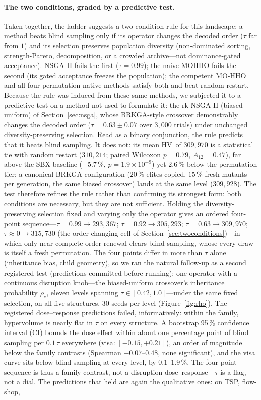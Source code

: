 \documentclass[runningheads]{llncs}
\newcommand{\HV}{\textsf{HV}}
\begin{document}
\paragraph{The two conditions, graded by a predictive test.}
Taken together, the ladder suggests a two-condition rule for this landscape: a method beats blind sampling only if its operator changes the decoded order ($\tau$ far from $1$) and its selection preserves population diversity (non-dominated sorting, strength-Pareto, decomposition, or a crowded archive---not dominance-gated acceptance). NSGA-II fails the first ($\tau=0.99$); the naive MOHHO fails the second (its gated acceptance freezes the population); the competent MO-HHO and all four permutation-native methods satisfy both and beat random restart. Because the rule was induced from these same methods, we subjected it to a predictive test on a method not used to formulate it: the rk-NSGA-II (biased uniform) of Section~\ref{sec:nsga}, whose BRKGA-style crossover demonstrably changes the decoded order ($\tau=0.63\pm0.07$ over $3{,}000$ trials) under unchanged diversity-preserving selection. Read as a binary conjunction, the rule predicts that it beats blind sampling. It does not: its mean \HV\ of $309{,}970$ is a statistical tie with random restart ($310{,}214$; paired Wilcoxon $p=0.79$, $A_{12}=0.47$), far above the SBX baseline ($+5.7\,\%$, $p=1.9\times10^{-9}$) yet $2.6\,\%$ below the permutation tier; a canonical BRKGA configuration ($20\,\%$ elites copied, $15\,\%$ fresh mutants per generation, the same biased crossover) lands at the same level ($309{,}928$). The test therefore refines the rule rather than confirming its strongest form: both conditions are necessary, but they are not sufficient. Holding the diversity-preserving selection fixed and varying only the operator gives an ordered four-point sequence---$\tau{=}0.99\!\to\!293{,}367$; $\tau{=}0.92\!\to\!305{,}293$; $\tau{=}0.63\!\to\!309{,}970$; $\tau{\approx}0\!\to\!315{,}730$ (the order-changing cell of Section~\ref{sec:twoconditions})---in which only near-complete order renewal clears blind sampling, whose every draw is itself a fresh permutation. The four points differ in more than $\tau$ alone (inheritance bias, child geometry), so we ran the natural follow-up as a second registered test (predictions committed before running): one operator with a continuous disruption knob---the biased-uniform crossover's inheritance probability $\rho_e$, eleven levels spanning $\tau\in[0.42,1.0]$---under the same fixed selection, on all five structures, 30 seeds per level (Figure~\ref{fig:rho}). The registered dose--response predictions failed, informatively: within the family, hypervolume is nearly flat in $\tau$ on every structure. A bootstrap 95\,\% confidence interval (CI) bounds the dose effect within about one percentage point of blind sampling per $0.1\,\tau$ everywhere (visa: $[-0.15,+0.21]$), an order of magnitude below the family contrasts (Spearman $-0.07$--$0.48$, none significant), and the visa curve sits below blind sampling at every level, by $0.1$--$1.9\,\%$. The four-point sequence is thus a family contrast, not a disruption dose--response---$\tau$ is a flag, not a dial. The predictions that held are again the qualitative ones: on TSP, flow-shop, 
\end{document}
